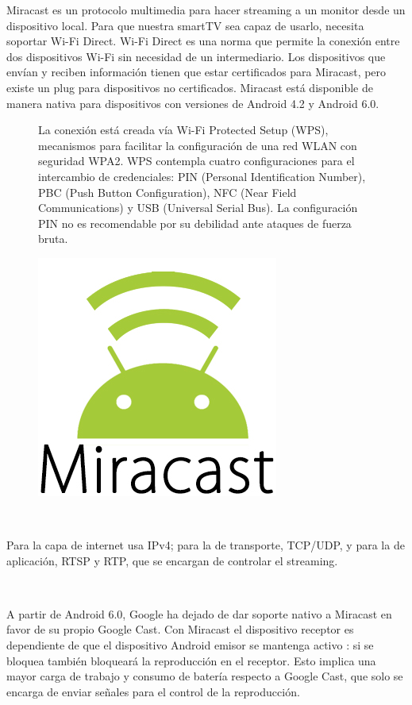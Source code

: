 Miracast es un protocolo multimedia para hacer streaming a un monitor desde un dispositivo local. Para que nuestra smartTV sea capaz de usarlo, necesita soportar Wi-Fi Direct. Wi-Fi Direct es una norma que permite la conexión entre dos dispositivos Wi-Fi sin necesidad de un intermediario.
Los dispositivos que envían y reciben información tienen que estar certificados para Miracast, pero existe un plug para dispositivos no certificados.
Miracast está disponible de manera nativa para dispositivos con versiones de Android 4.2 y Android 6.0.

\vspace{0.1cm}
\begin{figure}[ht]
	\begin{minipage}[b]{0.55\linewidth}
		La conexión está creada vía Wi-Fi Protected Setup (WPS), mecanismos para facilitar la configuración de una red WLAN con seguridad WPA2.
		WPS contempla cuatro configuraciones para el intercambio de credenciales: PIN (Personal Identification Number), PBC (Push Button Configuration), NFC (Near Field Communications) y USB (Universal Serial Bus). La configuración PIN no es recomendable por su debilidad ante ataques de fuerza bruta.
	\end{minipage}%
	\begin{minipage}[b]{0.45\linewidth}
		\centering
		\includegraphics[width=.55\linewidth]{./Imagenes/miracast.jpg}
	\end{minipage}
\end{figure}

\

Para la capa de internet usa IPv4; para la de transporte, TCP/UDP, y para la de aplicación, RTSP y RTP, que se encargan de controlar el streaming.

\

A partir de Android 6.0, Google ha dejado de dar soporte nativo a Miracast en favor de su propio Google Cast.
Con Miracast el dispositivo receptor es dependiente de que el dispositivo Android emisor se mantenga activo \cite{Miracast}: si se bloquea también bloqueará la reproducción en el receptor.
Esto implica una mayor carga de trabajo y consumo de batería respecto a Google Cast, que solo se encarga de enviar señales para el control de la reproducción.

